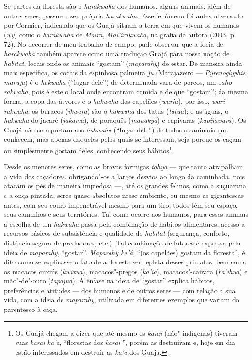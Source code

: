 Se partes da floresta são o \emph{harakwaha} dos humanos, alguns
animais, além de outros seres, possuem seu próprio \emph{harakwaha}.
Esse fenômeno foi antes observado por Cormier, indicando que os Guajá
situam a terra em que vivem os humanos (\emph{wy}) como o
\emph{harakwaha} de \emph{Maíra}, \emph{Mai'irakwaha}, na grafia da
autora (2003, p. 72). No decorrer de meu trabalho de campo, pude
observar que a ideia de \emph{harakwaha} também aparece como uma
tradução Guajá para nossa noção de \emph{habitat}, locais onde os
animais ``gostam'' (\emph{maparahỹ}) de estar. De maneira ainda mais
específica, os cocais da espinhosa palmeira \emph{ju} (Marajazeiro ---
\emph{Pyrenoglyphis maruja}) é o \emph{hakwaha} (``lugar dele'') de
determinada vara de porcos, um \emph{xaho rakwaha}, pois é este o local
onde encontram comida e de que ``gostam''; da mesma forma, a copa das
árvores é o \emph{hakwaha} dos capelães (\emph{waria}), por isso,
\emph{wari rakwaha}; os buracos (\emph{ikwara}) são o \emph{hakwaha} dos
tatus (\emph{tatua}); e as águas, o \emph{hakwaha} do jacaré
(\emph{jakarea}), de poraquês (\emph{manakya}) e capivaras
(\emph{kapijawara}). Os Guajá não se reportam aos \emph{hakwaha}
(``lugar dele'') de todos os animais que conhecem, mas apenas daqueles
pelos quais se interessam; seja porque os caçam ou simplesmente gostam
deles, conhecendo seus hábitos\footnote{Os Guajá chegam a dizer que até
  mesmo os \emph{karai} (não"-indígenas) tiveram suas \emph{karai ka'a},
  ``florestas dos \emph{karai} '', porém as destruíram e, hoje em dia,
  estão interessados em destruir as \emph{ka'a} dos Guajá.}.

Desde os menores seres, como as bravas formigas \emph{tahya} --- que tanto
atrapalham a vida dos caçadores, obrigando"-os a largos desvios ao longo
da caminhada, pois atacam os pés de maneira impiedosa ---, até os grandes
felinos, como a suçuarana e a onça pintada, seres quase absolutos nesse
ambiente, ou mesmo as gigantescas antas, com seu couro impenetrável
mesmo para um tiro, todos têm seu espaço, seus caminhos e seus
territórios. Tal como ocorre aos humanos, para esses animais a escolha
de um \emph{hakwaha} passa pela combinação de hábitos alimentares,
acesso a recursos básicos de subsistência e qualidade do \emph{habitat}
(segurança, conforto, distância segura de predadores, etc.). Tal
combinação de fatores é expressa pela ideia de \emph{maparahỹ},
``gostar''. \emph{Maparahỹ ka'á}, ``(os capelães) gostam da floresta'', é
dito como se explicasse o fato de a floresta ser repleta desses
primatas; bem como os macacos cuxiús (\emph{kwixua}), macacos"-pregos
(\emph{ka'ia}), macacos"-cairara (\emph{ka'ihua}) e mão"-de"-ouro
(\emph{tapajua}). A ênfase na ideia de ``gostar'' explica hábitos,
preferências e atitudes --- dos humanos e de outros seres --- com relação a
sua vida, com a ideia de \emph{maparahỹ}, utilizada em diferentes
exemplos que variam do parentesco à caça.

